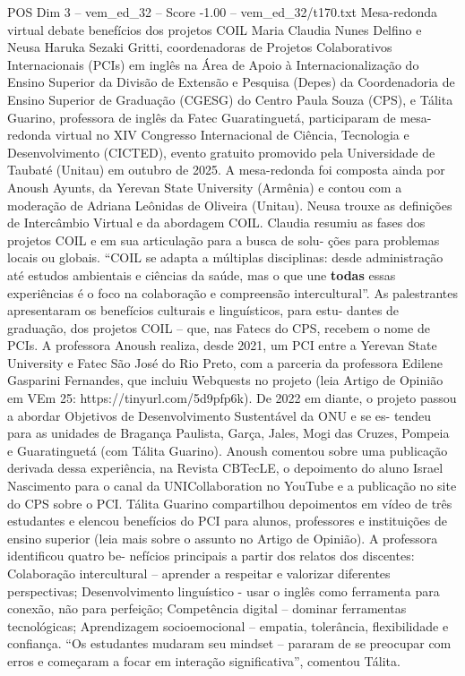 \begin{textsample}{POS Dim 3 – vem\_ed\_32 – Score -1.00 – vem\_ed\_32/t170.txt}  \label{ex:f3_pos_096}
Mesa-redonda virtual debate benefícios dos projetos COIL Maria Claudia Nunes Delfino e Neusa Haruka Sezaki Gritti, coordenadoras de Projetos Colaborativos Internacionais (PCIs) em inglês na Área de Apoio à Internacionalização do Ensino Superior da Divisão de Extensão e Pesquisa (Depes) da Coordenadoria de Ensino Superior de Graduação (CGESG) do Centro Paula Souza (CPS), e Tálita Guarino, professora de inglês da Fatec Guaratinguetá, participaram de mesa-redonda virtual no XIV Congresso Internacional de Ciência, Tecnologia e Desenvolvimento (CICTED), evento gratuito promovido pela Universidade de Taubaté (Unitau) em outubro de 2025.
A mesa-redonda foi composta ainda por Anoush Ayunts, da Yerevan State University (Armênia) e contou com a moderação de Adriana Leônidas de Oliveira (Unitau).
Neusa trouxe as definições de Intercâmbio Virtual e da abordagem COIL.
Claudia resumiu as fases dos projetos COIL e em sua articulação para a busca de solu- ções para problemas locais ou globais. “COIL se adapta a múltiplas disciplinas: desde administração até estudos ambientais e ciências da saúde, mas o que une \textbf{todas} essas experiências é o foco na colaboração e compreensão intercultural”.
As palestrantes apresentaram os benefícios culturais e linguísticos, para estu- dantes de graduação, dos projetos COIL – que, nas Fatecs do CPS, recebem o nome de PCIs.
A professora Anoush realiza, desde 2021, um PCI entre a Yerevan State University e Fatec São José do Rio Preto, com a parceria da professora Edilene Gasparini Fernandes, que incluiu Webquests no projeto (leia Artigo de Opinião em VEm 25: https://tinyurl.com/5d9pfp6k).
De 2022 em diante, o projeto passou a abordar Objetivos de Desenvolvimento Sustentável da ONU e se es- tendeu para as unidades de Bragança Paulista, Garça, Jales, Mogi das Cruzes, Pompeia e Guaratinguetá (com Tálita Guarino).
Anoush comentou sobre uma publicação derivada dessa experiência, na Revista CBTecLE, o depoimento do aluno Israel Nascimento para o canal da UNICollaboration no YouTube e a publicação no site do CPS sobre o PCI.
Tálita Guarino compartilhou depoimentos em vídeo de três estudantes e elencou benefícios do PCI para alunos, professores e instituições de ensino superior (leia mais sobre o assunto no Artigo de Opinião).
A professora identificou quatro be- nefícios principais a partir dos relatos dos discentes: Colaboração intercultural – aprender a respeitar e valorizar diferentes perspectivas; Desenvolvimento linguístico - usar o inglês como ferramenta para conexão, não para perfeição; Competência digital – dominar ferramentas tecnológicas; Aprendizagem socioemocional – empatia, tolerância, flexibilidade e confiança. “Os estudantes mudaram seu mindset – pararam de se preocupar com erros e começaram a focar em interação significativa”, comentou Tálita.

\end{textsample}

